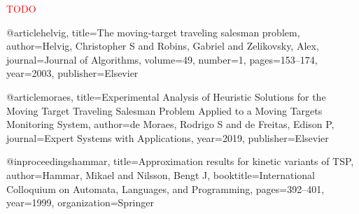\documentclass[english,version-2019-07]{uzl-thesis}
\begin{document}
%

\textcolor{red}{TODO}



%

\begin{bibtex-entries}

@article{helvig,
  title={The moving-target traveling salesman problem},
  author={Helvig, Christopher S and Robins, Gabriel and Zelikovsky, Alex},
  journal={Journal of Algorithms},
  volume={49},
  number={1},
  pages={153--174},
  year={2003},
  publisher={Elsevier}
}

@article{moraes,
  title={Experimental Analysis of Heuristic Solutions for the Moving Target Traveling Salesman Problem Applied to a Moving Targets Monitoring System},
  author={de Moraes, Rodrigo S and de Freitas, Edison P},
  journal={Expert Systems with Applications},
  year={2019},
  publisher={Elsevier}
}

@inproceedings{hammar,
  title={Approximation results for kinetic variants of TSP},
  author={Hammar, Mikael and Nilsson, Bengt J},
  booktitle={International Colloquium on Automata, Languages, and Programming},
  pages={392--401},
  year={1999},
  organization={Springer}
}


\end{bibtex-entries}
\end{document}

